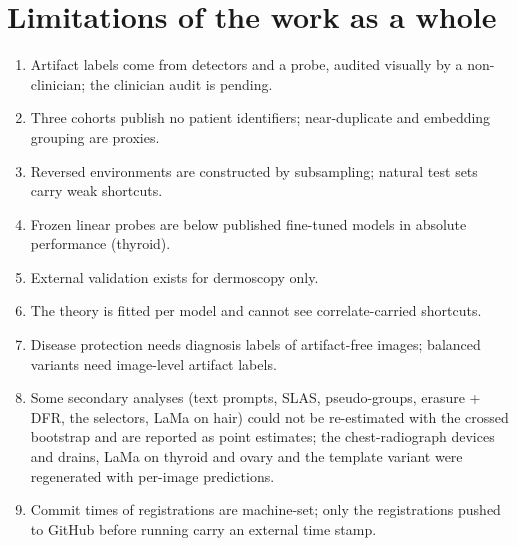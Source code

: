 \section{Limitations of the work as a whole}
\begin{enumerate}[leftmargin=*]\itemsep1pt
\item Artifact labels come from detectors and a probe, audited visually by a non-clinician; the clinician audit is pending.
\item Three cohorts publish no patient identifiers; near-duplicate and embedding grouping are proxies.
\item Reversed environments are constructed by subsampling; natural test sets carry weak shortcuts.
\item Frozen linear probes are below published fine-tuned models in absolute performance (thyroid).
\item External validation exists for dermoscopy only.
\item The theory is fitted per model and cannot see correlate-carried shortcuts.
\item Disease protection needs diagnosis labels of artifact-free images; balanced variants need image-level artifact labels.
\item Some secondary analyses (text prompts, SLAS, pseudo-groups, erasure + DFR, the selectors, LaMa on hair) could not be
re-estimated with the crossed bootstrap and are reported as point estimates; the chest-radiograph devices and drains,
LaMa on thyroid and ovary and the template variant were regenerated with per-image predictions.
\item Commit times of registrations are machine-set; only the registrations pushed to GitHub before running carry an
external time stamp.
\end{enumerate}

